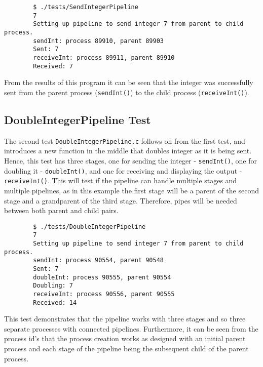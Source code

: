 \documentclass{article}
\begin{document}
        \begin{verbatim}
        $ ./tests/SendIntegerPipeline
        7
        Setting up pipeline to send integer 7 from parent to child process.
        sendInt: process 89910, parent 89903
        Sent: 7
        receiveInt: process 89911, parent 89910
        Received: 7
        \end{verbatim}

    \noindent From the results of this program it can be seen that the integer was successfully sent from the parent process (\verb+sendInt()+) to the child process (\verb+receiveInt()+).
    
    \subsection{DoubleIntegerPipeline Test}
    The second test \verb+DoubleIntegerPipeline.c+ follows on from the first test, and introduces a new function in the middle that doubles integer as it is being sent.
    Hence, this test has three stages, one for sending the integer - \verb+sendInt()+, one for doubling it - \verb+doubleInt()+, and one for receiving and displaying the output - \verb+receiveInt()+.
    This will test if the pipeline can handle multiple stages and multiple pipelines, as in this example the first stage will be a parent of the second stage and a grandparent of the third stage.
    Therefore, pipes will be needed between both parent and child pairs.

        \begin{verbatim}
        $ ./tests/DoubleIntegerPipeline
        7
        Setting up pipeline to send integer 7 from parent to child process.
        sendInt: process 90554, parent 90548
        Sent: 7
        doubleInt: process 90555, parent 90554
        Doubling: 7
        receiveInt: process 90556, parent 90555
        Received: 14
        \end{verbatim}

    \noindent This test demonstrates that the pipeline works with three stages and so three separate processes with connected pipelines.
    Furthermore, it can be seen from the process id's that the process creation works as designed with an initial parent process and each stage of the pipeline being the subsequent child of the parent process.
    
\end{document}
